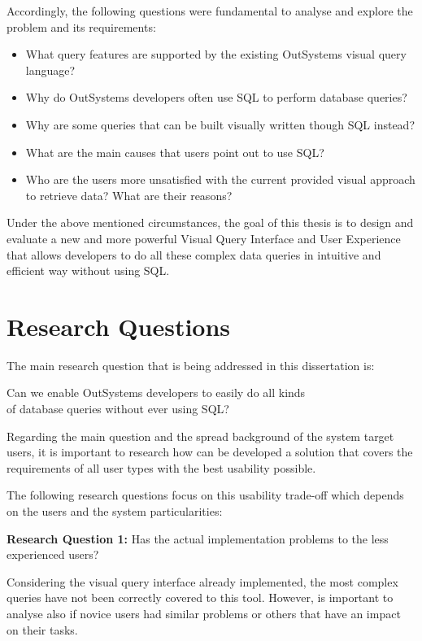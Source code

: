 Accordingly, the following questions were fundamental to analyse and explore the problem and its requirements:
\begin{itemize}
  \item What query features are supported by the existing OutSystems visual query language?
  \item Why do OutSystems developers often use SQL to perform database queries?
  \item Why are some queries that can be built visually written though SQL instead?
  \item What are the main causes that users point out to use SQL?
  \item Who are the users more unsatisfied with the current provided visual approach to retrieve data? What are their reasons?
\end{itemize}

Under the above mentioned circumstances, the goal of this thesis is to design and evaluate a new and more powerful Visual Query Interface and User Experience that allows developers to do all these complex data queries in intuitive and efficient way without using SQL.

\section{Research Questions}
\label{sec:research_questions}
The main research question that is being addressed in this dissertation is:
\begin{center}
  Can we enable OutSystems developers to easily do all kinds \\ of database queries without ever using SQL?
\end{center}

Regarding the main question and the spread background of the system target users, it is important to research how can be developed a solution that covers the requirements of all user types with the best usability possible.

The following research questions focus on this usability trade-off which depends on the users and the system particularities:

\medskip

\textbf{Research Question 1:} Has the actual implementation problems to the less experienced users?

\medskip

Considering the visual query interface already implemented, the most complex queries have not been correctly covered to this tool. However, is important to analyse also if novice users had similar problems or others that have an impact on their tasks.

